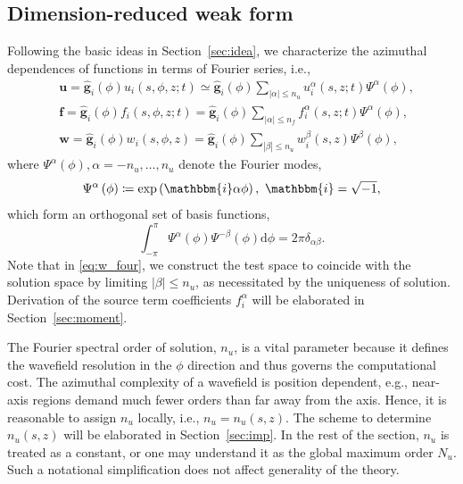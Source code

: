 \documentclass[extra]{gji}
\begin{document}
\subsection{Dimension-reduced weak form}
Following the basic ideas in Section~\ref{sec:idea}, we characterize 
the azimuthal dependences of functions in terms of Fourier series,
i.e.,
\begin{align}
  & \mathbf{u}=\hat{\mathbf{g}}_{i}\left(\phi\right) u_i\!\left(s,\phi,z;t\right) 
  \simeq \hat{\mathbf{g}}_{i}\left(\phi\right) \!\sum_{|\alpha|\le n_u} \!
  u_i^\alpha\!\left(s,z;t\right)\Psi^\alpha\left(\phi\right),
  \label{eq:u_four}\\[.5em]
  & \mathbf{f}=\hat{\mathbf{g}}_{i}\left(\phi\right) f_i\left(s,\phi,z;t\right) 
  = \hat{\mathbf{g}}_{i}\left(\phi\right) \!\sum_{|\alpha|\le n_f}\! 
  f_i^\alpha\left(s,z;t\right)\Psi^\alpha\left(\phi\right),
  \label{eq:f_four}\\[.5em]
  & \mathbf{w}=\hat{\mathbf{g}}_{i}\left(\phi\right) w_i\left(s,\phi,z\right) 
  = \hat{\mathbf{g}}_{i}\left(\phi\right) \sum_{|\beta|\le n_u} 
  w_i^\beta\left(s,z\right)\Psi^\beta\left(\phi\right),
  \label{eq:w_four}
\end{align}
where $\Psi^\alpha\left(\phi\right), \alpha=-n_u,\dots,n_u$ denote the Fourier modes, 
\begin{equation}
  \Psi^\alpha\left(\phi\right)\coloneqq\exp\left(\mathbbm{i}\alpha\phi\right),\ \mathbbm{i}=\sqrt{-1},
\end{equation}
which form an orthogonal set of basis functions,
\begin{equation}
  \int_{-\pi}^{\pi}\Psi^\alpha\left(\phi\right)\Psi^{-\beta}\left(\phi\right)\text{d}\phi=
  2\pi\delta_{\alpha\beta}.
  \label{eq:orth}
\end{equation}
Note that in \eqref{eq:w_four}, we construct the test space to coincide 
with the solution space by limiting $|\beta|\le n_u$, as necessitated by
the uniqueness of solution. Derivation of the source term
coefficients $f_i^\alpha$ will be elaborated in Section~\ref{sec:moment}.

The Fourier spectral order of solution, $n_u$, is a vital parameter 
because it defines the wavefield resolution in the $\phi$
direction and thus governs the computational cost. 
The azimuthal complexity of a wavefield is position dependent, 
e.g., near-axis regions demand much fewer orders than
far away from the axis. Hence, it is reasonable to assign 
$n_u$ locally, i.e., $n_u=n_u\left(s,z\right)$. The scheme to determine 
$n_u\left(s,z\right)$ will be elaborated in Section~\ref{sec:imp}. In the 
rest of the section, $n_u$ is treated as a constant, or one may
understand it as the global maximum order $N_u$. 
Such a notational simplification
does not affect generality of the theory. 
\end{document}

